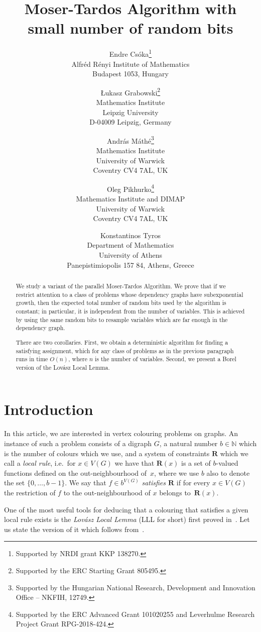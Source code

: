 \documentclass[12pt,a4paper]{article}
\title{Moser-Tardos Algorithm with small number of random bits}
\author{Endre Csóka\thanks{Supported by NRDI grant KKP 138270.}\\
    Alfr\'ed R\'enyi Institute of Mathematics\\ Budapest 1053, Hungary\\
    \and 
    Łukasz Grabowski\thanks{Supported by the ERC Starting Grant 805495.}\\
    Mathematics Institute\\ 
    Leipzig University\\
    D-04009 Leipzig, Germany\\
    \and 
    András Máthé\thanks{Supported by the Hungarian National Research, Development and Innovation Office -- NKFIH, 12749.}\\ Mathematics Institute\\
    University of Warwick\\
    Coventry CV4 7AL, UK\\ 
    \and 
    Oleg Pikhurko\thanks{Supported by the ERC Advanced Grant 101020255 and Leverhulme Research Project Grant RPG-2018-424.}\\ Mathematics Institute and DIMAP\\
    University of Warwick\\
    Coventry CV4 7AL, UK\\ 
    \and 
    Konstantinos Tyros\\
    Department of Mathematics\\ University of Athens\\
     Panepistimiopolis 157 84, 
    Athens, Greece}
\numberwithin{equation}{section}
\theoremstyle{definition}
\newcommand\NN{\mathbb N}
\begin{document}
    \maketitle
    
    \begin{abstract}
    We study a variant of the parallel Moser-Tardos Algorithm. We prove that if we restrict attention to a class of problems whose dependency graphs have subexponential growth, then the expected total number of random bits used by the algorithm is constant; in particular, it is independent from the number of variables. This is achieved by using the same random bits to resample variables which are far enough in the dependency graph. 
    
    There are two corollaries. First, we obtain a deterministic algorithm for finding a satisfying assignment, which for any class of problems as in the previous paragraph runs in time $O(n)$, where $n$ is the number of variables.  Second, we present a Borel version of the Lov\'asz Local Lemma.
    \end{abstract}
    
    
    
\setcounter{tocdepth}{2}
  \tableofcontents
   
    \newcommand{\rnd}{\normalfont{\texttt{rnd}}}
    \newcommand{\RND}{\normalfont{\texttt{RND}}}
    
   
    
    
    
    \section{Introduction}
    
    In this article, we are interested in vertex colouring problems on graphs.  An instance of such a problem consists of a digraph $G$, a natural number $b\in\NN$ which is the number of colours which we use, and a system of constraints $\mathbf R$ which we call a \emph{local rule}, i.e.~for $x\in V(G)$ we have that $\mathbf R(x)$ is a set of $b$-valued functions defined on the out-neighbourhood of~$x$, where we use $b$ also to denote the set $\{0,\dots,b-1\}$.  We say that $f\in b^{V(G)}$  \textit{satisfies $\mathbf R$} if  for every $x\in V(G)$ the restriction of $f$ to the out-neighbourhood of $x$ belongs to~$\mathbf R(x)$. 
    
    One of the most useful tools for deducing that a colouring that satisfies a given local rule exists is the 
     \emph{Lov{\'a}sz Local Lemma} (LLL for short) first proved in~\cite{MR0382050}. Let us state the version of it which follows from~\cite{MR0491337}.
    
\end{document}
